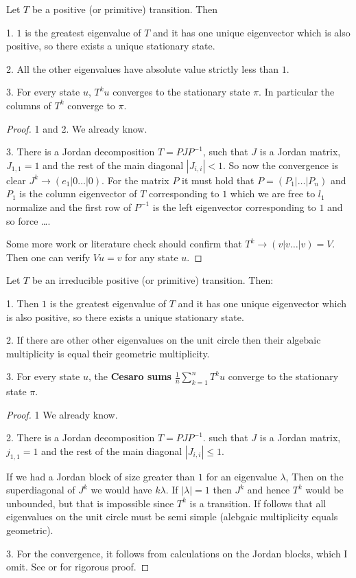 \begin{thm}
\label{Ax:thm:transition_ev}
Let $T$ be a positive (or primitive) transition. Then 

1. $1$ is the greatest eigenvalue
of $T$ and it has one unique eigenvector which is also positive,
so there exists a unique stationary state.

2. All the other eigenvalues have absolute value strictly less than $1$.

3. For every state $u$, $T^ku$ converges to the stationary state $\pi$.
In particular the columns of $T^k$ converge to $\pi$.

\begin{proof}
1 and 2. We already know.

3. There is a Jordan decomposition $T = PJP^{-1}$, such that $J$ is a Jordan
matrix, $J_{1,1} = 1$ and the rest of the main diagonal $|J_{i,i}| <1$.
So now the convergence is clear $J^k \to (e_1 | 0 \dots | 0)$.
For the matrix $P$ it must hold that $P = (P_1| \dots| P_n)$ and $P_1$ is the column 
eigenvector of $T$ corresponding to $1$ which we are free to $l_1$ normalize 
and the first row of $P^{-1}$ is the
left eigenvector corresponding to $1$ and so force \dots.

Some more work or literature check should confirm that $T^k \to (v|v\dots|v) = V$.
Then one can verify $Vu = v$ for any state $u$.
\end{proof}
\end{thm}

\begin{thm}
\label{Ax:thm:transition_irr_ev}
Let $T$ be an irreducible positive (or primitive) transition. 
Then:

1. Then $1$ is the greatest eigenvalue
of $T$ and it has one unique eigenvector which is also positive,
so there exists a unique stationary state.

2. If there are other other eigenvalues on the unit circle then their algebaic
multiplicity is equal their geometric multiplicity.

3. For every state $u$, the \textbf{Cesaro sums} 
$\frac{1}{n}\sum_{k=1}^n T^ku$ converge to the stationary state $\pi$.

\begin{proof}
1 We already know.

2. There is a Jordan decomposition $T = PJP^{-1}$. such that $J$ is a Jordan
matrix, $j_{1,1} = 1$ and the rest of the main diagonal $|J_{i,i}| \leq 1$.

If we had a Jordan block of size greater than $1$ for an eigenvalue $\lambda$,
Then on the superdiagonal of $J^k$ we would have $k \lambda$. If $|\lambda| =1$
then $J^k$ and hence $T^k$ would be unbounded, but that is impossible since
$T^k$ is a transition. If follows that all eigenvalues on the unit circle must
be semi simple (alebgaic multiplicity equals geometric).

3. For the convergence, it follows from calculations on the Jordan blocks, which
I omit. See \textcite{meyer2000matrix} or \textcite{serre2010matrices}
for rigorous proof.
\end{proof}
\end{thm}


